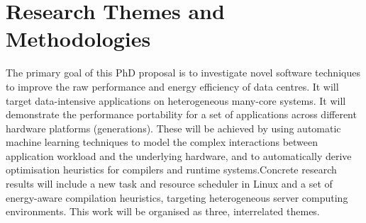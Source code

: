 \section{Research Themes and Methodologies}
The primary goal of this PhD proposal is to investigate novel software techniques to improve the raw performance and energy efficiency of data centres. It will target data-intensive applications on heterogeneous many-core systems. It will demonstrate the performance portability for a set of applications across different hardware platforms (generations). These will be achieved by using automatic machine learning techniques to model the complex interactions between application workload and the underlying hardware, and to automatically derive optimisation heuristics for compilers and runtime systems.Concrete research results will include a new task and resource scheduler in Linux and a set of energy-aware compilation heuristics, targeting heterogeneous server computing environments. This work will be organised as three, interrelated themes. 

